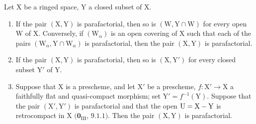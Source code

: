 \begin{corollary}[21.13.6]
\label{IV.21.13.6}
Let $\mathrm{X}$ be a ringed space, $\mathrm{Y}$ a closed subset of $\mathrm{X}$.
\begin{enumerate}[label=\textup{(\roman*)}]
  \item If the pair $(\mathrm{X},\mathrm{Y})$ is parafactorial, then so is $(\mathrm{W},\mathrm{Y}\cap\mathrm{W})$ for every open $\mathrm{W}$ of $\mathrm{X}$.
  Conversely, if $(\mathrm{W}_\alpha)$ is an open covering of $\mathrm{X}$ such that each of the pairs $(\mathrm{W}_\alpha,\mathrm{Y}\cap\mathrm{W}_\alpha)$ is parafactorial, then the pair $(\mathrm{X},\mathrm{Y})$ is parafactorial.
  \item If the pair $(\mathrm{X},\mathrm{Y})$ is parafactorial, then so is $(\mathrm{X},\mathrm{Y}')$ for every closed subset $\mathrm{Y}'$ of $\mathrm{Y}$.
  \item Suppose that $\mathrm{X}$ is a prescheme, and let $\mathrm{X}'$ be a prescheme, $f:\mathrm{X}'\to\mathrm{X}$ a faithfully flat and quasi-compact morphism; set $\mathrm{Y}'=f^{-1}(\mathrm{Y})$.
  Suppose that the pair $(\mathrm{X}',\mathrm{Y}')$ is parafactorial and that the open $\mathrm{U}=\mathrm{X}-\mathrm{Y}$ is retrocompact in $\mathrm{X}$ $(\mathbf{0}_{\mathrm{III}}$, $9.1.1)$.
  Then the pair $(\mathrm{X},\mathrm{Y})$ is parafactorial.
\end{enumerate}
\end{corollary}

